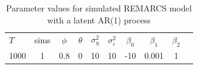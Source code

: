 \begin{table}[H]
\centering\begin{tabular}{lccccccccc}
\hline
$T$ & sims & $\phi$ & $\theta$ & $\sigma_\eta^2$ & $\sigma_\varepsilon^2$ & $\beta_0$ & $\beta_1$ & $\beta_2$ \\
1000 & 1 & 0.8 & 0 & 10 & 10 & -10 & 0.001 & 1 \\
\hline
\end{tabular}
\caption{Parameter values for simulated REMARCS model with a latent AR(1) process}
\label{tab:param_values_ma}
\end{table}


